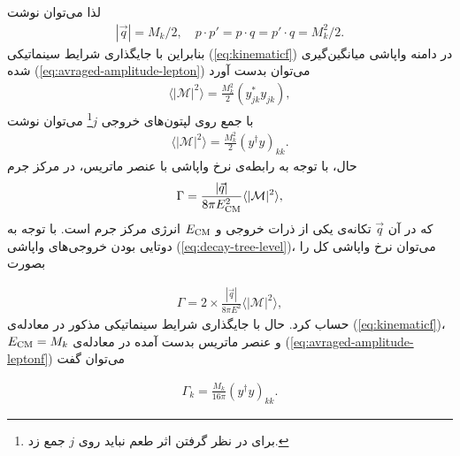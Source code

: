\documentclass[a4paper]{book}
\begin{document}
لذا می‌توان نوشت
{\footnotesize\begin{align}
	|\vec{q}|=M_k/2, \quad
	p \cdot p' = p \cdot q = p' \cdot q = M_k^2/2.
	\label{eq:kinematicf}
\end{align}}
بنابراین با جایگذاری شرایط سینماتیکی (\ref{eq:kinematicf}) در دامنه واپاشی میانگین‌گیری شده (\ref{eq:avraged-amplitude-lepton}) می‌توان بدست آورد
{\footnotesize\begin{align}
	\langle|\mathcal{M}|^2\rangle=\frac{M_k^2}{2}(y^*_{jk} y_{jk}),
\end{align}}
با جمع روی لپتون‌های خروجی {\footnotesize$j$}\footnote{برای در نظر گرفتن اثر طعم نباید روی {\footnotesize$j$} جمع زد.} می‌توان نوشت
{\footnotesize\begin{align}
	\langle|\mathcal{M}|^2\rangle=\frac{M_k^2}{2}\left(y^{\dagger}y\right)_{kk}.
	\label{eq:avraged-amplitude-leptonf}
\end{align}}
حال، با توجه به رابطه‌ی نرخ واپاشی با عنصر ماتریس، در مرکز جرم
{\footnotesize\begin{align}
	\Gamma=\frac{|\vec{q}|}{8 \pi E_{\rm CM}^2} \langle|\mathcal{M}|^2\rangle,
	\label{eq:decay-rate-matrix-element}
\end{align}}
که در آن {\footnotesize$\vec{q}$} ‌‌‌‌تکانه‌ی یکی از ذرات خروجی و {\footnotesize$E_{\rm CM}$} انرژی مرکز جرم است. با توجه به دوتایی بودن خروجی‌های واپاشی (\ref{eq:decay-tree-level})، می‌توان نرخ واپاشی کل را بصورت
\par
\vspace{-0.5cm}
{\footnotesize\begin{align}
	\Gamma = 2 \times \frac{|\vec{q}|}{8 \pi E^2} \langle|\mathcal{M}|^2\rangle,
\end{align}}
حساب کرد. حال با جایگذاری شرایط سینماتیکی مذکور در معادله‌ی (\ref{eq:kinematicf})، {\footnotesize$E_{\rm CM}=M_k$} و عنصر ماتریس بدست آمده در معادله‌ی (\ref{eq:avraged-amplitude-leptonf}) می‌توان گفت
\par
\vspace{-0.5cm}
{\footnotesize\begin{align}
	\Gamma_k =\frac{M_k}{16 \pi} \left(y^{\dagger} y\right)_{kk}.
	\label{eq:decay-rate-lepton}
\end{align}}
\end{document}
